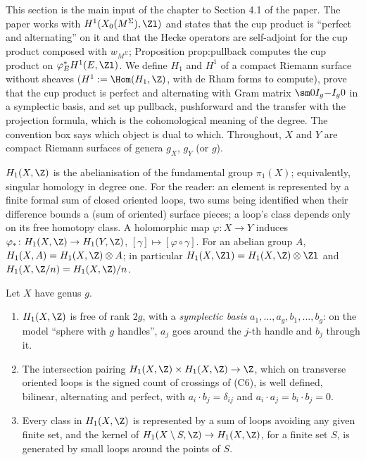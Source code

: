 This section is the main input of the chapter to Section 4.1 of the paper. The paper works with $H^1(X_0(M^\Sigma),\Zl)$ and states that the cup product is ``perfect
and alternating'' on it and that the Hecke operators are self-adjoint for the cup product composed with $w_{M^\Sigma}$; Proposition prop:pullback computes the cup
product on $\varphi_E^*H^1(E,\Zl)$. We define $H_1$ and $H^1$ of a compact Riemann surface without sheaves ($H^1:=\Hom(H_1,\Z)$, with de Rham forms to compute), prove
that the cup product is perfect and alternating with Gram matrix $\sm0{I_g}{-I_g}0$ in a symplectic basis, and set up pullback, pushforward and the transfer with the
projection formula, which is the cohomological meaning of the degree. The convention box  says which object is dual to which. Throughout,
$X$ and $Y$ are compact Riemann surfaces of genera $g_X$, $g_Y$ (or $g$).

\begin{definition}\label{def:curves:homology}
$H_1(X,\Z)$ is the abelianisation of the fundamental group $\pi_1(X)$; equivalently, singular homology in degree one. For the reader: an element is represented by a
finite formal sum of closed oriented loops, two sums being identified when their difference bounds a (sum of oriented) surface pieces; a loop's class depends only on
its free homotopy class. A holomorphic map $\varphi\colon X\to Y$ induces $\varphi_*\colon H_1(X,\Z)\to H_1(Y,\Z)$, $[\gamma]\mapsto[\varphi\circ\gamma]$. For an abelian group $A$,
$H_1(X,A)=H_1(X,\Z)\otimes A$; in particular $H_1(X,\Zl)=H_1(X,\Z)\otimes\Zl$ and $H_1(X,\Z/n)=H_1(X,\Z)/n$.
\end{definition}

\begin{theorem}\label{thm:curves:symplectic-basis}
Let $X$ have genus $g$.
\begin{enumerate}[label=(\roman*)]
\item $H_1(X,\Z)$ is free of rank $2g$, with a \emph{symplectic basis} $a_1,\dots,a_g,b_1,\dots,b_g$: on the model ``sphere with $g$ handles'', $a_j$ goes around the $j$-th handle
and $b_j$ through it.
\item The intersection pairing $H_1(X,\Z)\times H_1(X,\Z)\to\Z$, which on transverse oriented loops is the signed count of crossings of (C6), is
well defined, bilinear, alternating and perfect, with $a_i\cdot b_j=\delta_{ij}$ and $a_i\cdot a_j=b_i\cdot b_j=0$.
\item Every class in $H_1(X,\Z)$ is represented by a sum of loops avoiding any given finite set, and the kernel of $H_1(X\setminus S,\Z)\to H_1(X,\Z)$, for a finite set
$S$, is generated by small loops around the points of $S$.
\end{enumerate}
\end{theorem}

